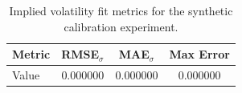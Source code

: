 \begin{table}[h!]
\centering
\begin{tabular}{lccc}
\hline
Metric & RMSE$_\sigma$ & MAE$_\sigma$ & Max Error \\
\hline
Value & 0.000000 & 0.000000 & 0.000000 \\
\hline
\end{tabular}
\caption{Implied volatility fit metrics for the synthetic calibration experiment.}
\label{tab:metrics}
\end{table}
